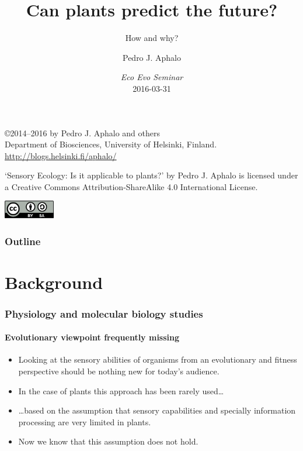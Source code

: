 \documentclass[utf8]{beamer}\usepackage[]{graphicx}\usepackage[]{color} %
\title{Can plants predict the future?}
\subtitle{How and why?}
\author{Pedro J. Aphalo}
\date{\emph{Eco Evo Seminar}\\ 2016-03-31}
\institute[SenPEP]{ViPS, Department of Biosciences, University of Helsinki\\[2ex] \pgfuseimage{mylogo}}
\begin{document}

\begin{frame}
\maketitle
\end{frame}

\begin{frame}[c]
\begin{center}
\begin{small}
\copyright 2014--2016 by Pedro J. Aphalo and others\\
Department of Biosciences, University of Helsinki, Finland.\\
\textcolor{blue}{\url{http://blogs.helsinki.fi/aphalo/}}\\[2ex]
\end{small}

\begin{footnotesize}
`Sensory Ecology: Is it applicable to plants?'
by Pedro J. Aphalo is licensed under a Creative Commons Attribution-ShareAlike 4.0 International License.\\[2ex]
\end{footnotesize}

\includegraphics[width=6em]{copyright/by-sa}
\end{center}
\end{frame}


\begin{frame}
\frametitle{Outline}
\tableofcontents
\end{frame}

\section{Background}

\begin{frame}[<+->]
  \frametitle{Physiology and molecular biology studies}
  \framesubtitle{Evolutionary viewpoint frequently missing}
  \begin{itemize}
    \item Looking at the sensory abilities of organisms from an evolutionary and fitness perspective should be nothing new for today's audience.
    \item In the case of plants this approach has been rarely used\ldots
    \item \ldots based on the assumption that sensory capabilities and specially information processing are very limited in plants.
    \item Now we know that this assumption does not hold.
  \end{itemize}
\end{frame}
\end{document}
